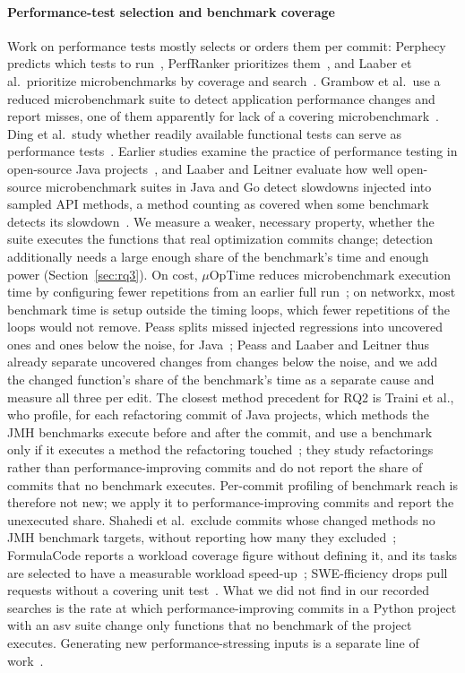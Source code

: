 \paragraph*{Performance-test selection and benchmark coverage}
Work on performance tests mostly selects or orders them per commit: Perphecy predicts which tests to run~\cite{deoliveira2017perphecy}, PerfRanker prioritizes them~\cite{mostafa2017perfranker}, and Laaber et al.\ prioritize microbenchmarks by coverage and search~\cite{laaber2021tcp,laaber2022searchbased}.
Grambow et al.\ use a reduced microbenchmark suite to detect application performance changes and report misses, one of them apparently for lack of a covering microbenchmark~\cite{grambow2022microbenchmark}.
Ding et al.\ study whether readily available functional tests can serve as performance tests~\cite{ding2020readily}.
Earlier studies examine the practice of performance testing in open-source Java projects~\cite{leitner2017state,stefan2017unit}, and Laaber and Leitner evaluate how well open-source microbenchmark suites in Java and Go detect slowdowns injected into sampled API methods, a method counting as covered when some benchmark detects its slowdown~\cite{laaber2018evaluation}.
We measure a weaker, necessary property, whether the suite executes the functions that real optimization commits change; detection additionally needs a large enough share of the benchmark's time and enough power (Section~\ref{sec:rq3}).
On cost, $\mu$OpTime reduces microbenchmark execution time by configuring fewer repetitions from an earlier full run~\cite{japke2025uoptime}; on networkx, most benchmark time is setup outside the timing loops, which fewer repetitions of the loops would not remove.
Peass splits missed injected regressions into uncovered ones and ones below the noise, for Java~\cite{reichelt2023peass}; Peass and Laaber and Leitner thus already separate uncovered changes from changes below the noise, and we add the changed function's share of the benchmark's time as a separate cause and measure all three per edit.
The closest method precedent for RQ2 is Traini et al., who profile, for each refactoring commit of Java projects, which methods the JMH benchmarks execute before and after the commit, and use a benchmark only if it executes a method the refactoring touched~\cite{traini2021refactoring}; they study refactorings rather than performance-improving commits and do not report the share of commits that no benchmark executes.
Per-commit profiling of benchmark reach is therefore not new; we apply it to performance-improving commits and report the unexecuted share.
Shahedi et al.\ exclude commits whose changed methods no JMH benchmark targets, without reporting how many they excluded~\cite{shahedi2025method}; FormulaCode reports a workload coverage figure without defining it, and its tasks are selected to have a measurable workload speed-up~\cite{sehgal2026formulacode}; SWE-fficiency drops pull requests without a covering unit test~\cite{ma2025swefficiency}.
What we did not find in our recorded searches is the rate at which performance-improving commits in a Python project with an asv suite change only functions that no benchmark of the project executes.
Generating new performance-stressing inputs is a separate line of work~\cite{yang2025wedge}.

